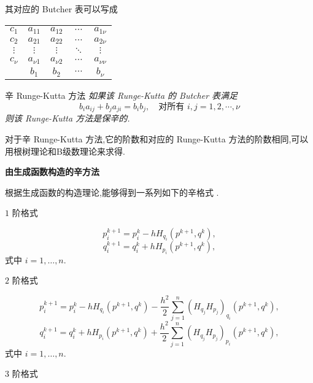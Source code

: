 其对应的 Butcher 表可以写成

\begin{center}
  \begin{tabular}{c|cccc}
    $c_1$&$a_{11}$&$a_{12}$&$\cdots$&$a_{1\nu}$\\
    $c_2$&$a_{21}$&$a_{22}$&$\cdots$&$a_{2\nu}$\\
    $\vdots$&$\vdots$&$\vdots$&$\ddots$&$\vdots$\\
    $c_{\nu}$&$a_{\nu 1}$&$a_{\nu 2}$&$\cdots$&$a_{\nu \nu}$\\
    \hline
         &$b_{1}$&$b_{2}$&$\cdots$&$b_{\nu}$
  \end{tabular}
\end{center}

\begin{theorem}{辛 Runge-Kutta 方法\cite{sanz1988runge}}
\emph{如果该 Runge-Kutta 的 Butcher 表满足
\begin{equation*}
  b_ia_{ij}+b_ja_{ji}=b_ib_j,\quad \textrm{对所有}\,\, i,j=1,2,\cdots,\nu
\end{equation*}
则该 Runge-Kutta 方法是保辛的.}
\end{theorem}

对于辛 Runge-Kutta 方法,它的阶数和对应的 Runge-Kutta 方法的阶数相同,可以用根树理论和B级数理论来求得.

\noindent \textbf{由生成函数构造的辛方法}

根据生成函数的构造理论,能够得到一系列如下的辛格式 \cite{feng2003sym}.

$1$ 阶格式

\begin{equation*}
	p_i^{k+1}= p_i^{k}-hH_{q_i}(p^{k+1},q^{k}),
\end{equation*}
\begin{equation*}
	q_i^{k+1}= q_i^{k}+hH_{p_i}(p^{k+1},q^{k}),
\end{equation*}
式中 $i=1,\ldots,n$.

$2$ 阶格式

\begin{equation*}
	p_i^{k+1}= p_i^{k}-hH_{q_i}(p^{k+1},q^{k})-\frac{h^2}{2}\sum_{j=1}^n(H_{q_j}H_{p_j})_{q_i}(p^{k+1},q^{k}),
\end{equation*}
\begin{equation*}
	q_i^{k+1}= q_i^{k}+hH_{p_i}(p^{k+1},q^{k})+\frac{h^2}{2}\sum_{j=1}^n(H_{q_j}H_{p_j})_{p_i}(p^{k+1},q^{k}),
\end{equation*}
式中 $i=1,\ldots,n$.

$3$ 阶格式

